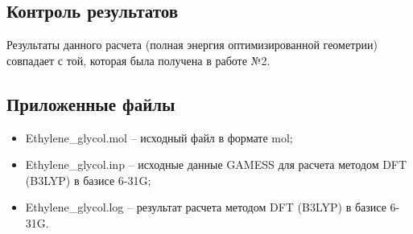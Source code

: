 \subsection{Контроль результатов}
Результаты данного расчета (полная энергия оптимизированной геометрии) совпадает с той, которая была получена в работе №2.

\subsection{Приложенные файлы}
\begin{itemize}
    \item Ethylene\_glycol.mol – исходный файл в формате mol;
    \item Ethylene\_glycol.inp – исходные данные GAMESS для расчета методом DFT (B3LYP) в базисе 6-31G;
    \item Ethylene\_glycol.log – результат расчета методом DFT (B3LYP)  в базисе 6-31G.
\end{itemize}{}